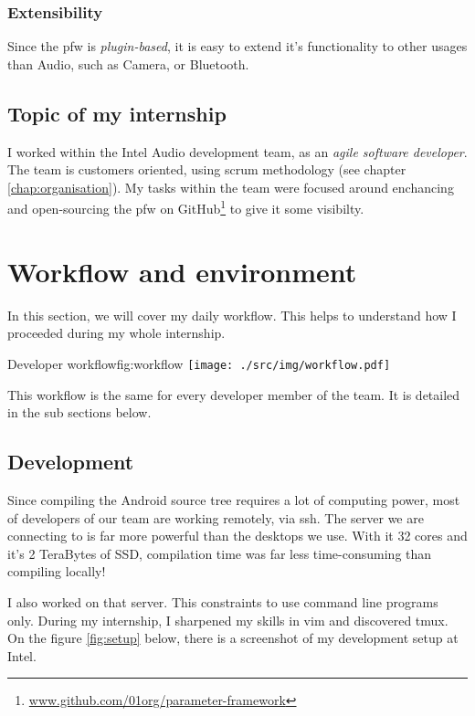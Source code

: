 \subsubsection{Extensibility}
Since the \gls{pfw} is \emph{plugin-based}, it is easy to extend it's functionality to other usages than Audio, such
as Camera, or Bluetooth.


\subsection{Topic of my internship}
I worked within the Intel Audio development team, as an \emph{agile
software developer}. The team is customers oriented, using \gls{scrum}
methodology (see chapter \ref{chap:organisation}). My tasks
within the team were focused around enchancing and open-sourcing the \gls{pfw} on
\gls{GitHub}\footnote{\url{www.github.com/01org/parameter-framework}} to give it some
visibilty.


\section{Workflow and environment}
In this section, we will cover my daily workflow. This helps
to understand how I proceeded during my whole internship.

\begin{figureGraphics}{Developer workflow}{fig:workflow}
    \texttt{[image: ./src/img/workflow.pdf]}
\end{figureGraphics}

This workflow is the same for every developer member of the team. It is
detailed in the sub sections below.

\subsection{Development}
Since compiling the Android source tree requires a lot of computing power,
most of developers of our team are working remotely, via ssh.
The server we are connecting to is far more powerful than the desktops we use.
With it 32 cores and it's 2 TeraBytes of SSD, compilation time was far less time-consuming
than compiling locally!

I also worked on that server. This constraints to use command line programs only.
During my internship, I sharpened my skills in \gls{vim} and discovered \gls{tmux}.
On the figure \ref{fig:setup} below, there is a screenshot of my development setup at Intel.

